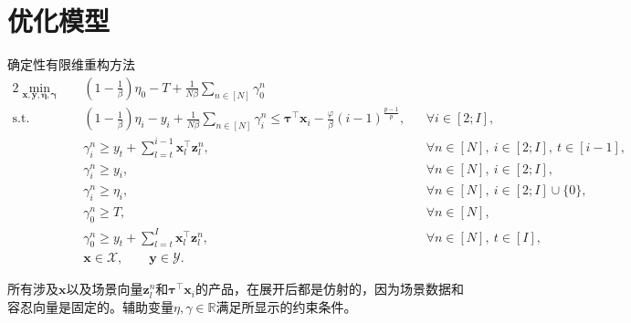 \documentclass[12pt,a4paper]{article}
\begin{document}
\section*{优化模型}
确定性有限维重构方法
\begin{alignat}{2}
\min_{\boldsymbol{x},\boldsymbol{y},\boldsymbol{\eta},\boldsymbol{\gamma}}\quad
&\left(1-\frac{1}{\beta}\right)\eta_0-T
+\frac{1}{N\beta}\sum_{n\in[N]}\gamma_0^n
\label{eq:objective}\\[0.5em]
\text{s.t.}\quad
&\left(1-\frac{1}{\beta}\right)\eta_i-y_i
+\frac{1}{N\beta}\sum_{n\in[N]}\gamma_i^n
\le \boldsymbol{\tau}^{\top}\boldsymbol{x}_i
-\frac{\varphi}{\beta}(i-1)^{\frac{p-1}{p}},
&&\forall i\in[2;I],
\label{eq:delay-cvar}\\
&\gamma_i^n\ge y_t+
\sum_{l=t}^{i-1}\boldsymbol{x}_l^{\top}\boldsymbol{z}_l^n,
&&\forall n\in[N],\ i\in[2;I],\ t\in[i-1],
\label{eq:delay-scenario}\\
&\gamma_i^n\ge y_i,
&&\forall n\in[N],\ i\in[2;I],
\label{eq:appointment-scenario}\\
&\gamma_i^n\ge\eta_i,
&&\forall n\in[N],\ i\in[2;I]\cup\{0\},
\label{eq:threshold-scenario}\\
&\gamma_0^n\ge T,
&&\forall n\in[N],
\label{eq:overtime-horizon}\\
&\gamma_0^n\ge y_t+
\sum_{l=t}^{I}\boldsymbol{x}_l^{\top}\boldsymbol{z}_l^n,
&&\forall n\in[N],\ t\in[I],
\label{eq:overtime-scenario}\\
&\boldsymbol{x}\in\mathcal{X},\qquad \boldsymbol{y}\in\mathcal{Y}.&&
\label{eq:domains}
\end{alignat}

所有涉及$\boldsymbol{x}$以及场景向量$\boldsymbol{z}_l^n$和$\boldsymbol{\tau}^{\top}\boldsymbol{x}_i$的产品，在展开后都是仿射的，因为场景数据和容忍向量是固定的。辅助变量$\eta,\gamma\in\mathbb R$满足所显示的约束条件。
\end{document}
